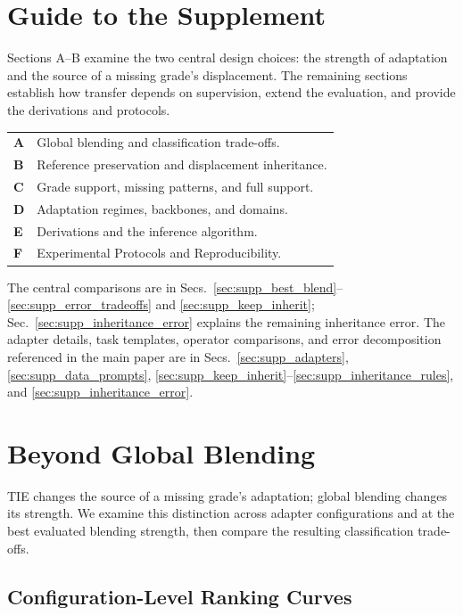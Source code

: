 \section*{Guide to the Supplement}
Sections A--B examine the two central design choices: the strength of adaptation and the source of a missing grade's displacement.
The remaining sections establish how transfer depends on supervision, extend the evaluation, and provide the derivations and protocols.

\noindent\begin{tabularx}{\columnwidth}{@{}lX@{}}
\textbf{A} & Global blending and classification trade-offs.\\
\textbf{B} & Reference preservation and displacement inheritance.\\
\textbf{C} & Grade support, missing patterns, and full support.\\
\textbf{D} & Adaptation regimes, backbones, and domains.\\
\textbf{E} & Derivations and the inference algorithm.\\
\textbf{F} & Experimental Protocols and Reproducibility.
\end{tabularx}

\noindent The central comparisons are in Secs.~\ref{sec:supp_best_blend}--\ref{sec:supp_error_tradeoffs} and \ref{sec:supp_keep_inherit}; Sec.~\ref{sec:supp_inheritance_error} explains the remaining inheritance error.
The adapter details, task templates, operator comparisons, and error decomposition referenced in the main paper are in Secs.~\ref{sec:supp_adapters}, \ref{sec:supp_data_prompts}, \ref{sec:supp_keep_inherit}--\ref{sec:supp_inheritance_rules}, and \ref{sec:supp_inheritance_error}.

\section{Beyond Global Blending}
\label{sec:supp_blending}

TIE changes the source of a missing grade's adaptation; global blending changes its strength.
We examine this distinction across adapter configurations and at the best evaluated blending strength, then compare the resulting classification trade-offs.

\subsection{Configuration-Level Ranking Curves}
\label{sec:supp_config_curves}

